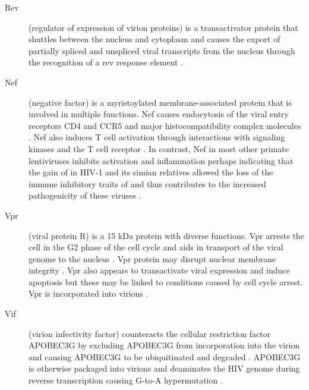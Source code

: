 \documentclass[../sherrill-Mix_thesis.tex]{subfiles}
\begin{document}
\begin{description}
		\item[Rev]
			(regulator of expression of virion proteins) is a transactivator protein that shuttles between the nucleus and cytoplasm \citep{Meyer1994} and causes the export of partially spliced and unspliced viral transcripts \citep{Sodroski1986,Feinberg1986,Knight1987,Malim1988,Gutman1988} from the nucleus through the recognition of a rev response element \citep{Malim1989,Malim1989a}.
		\item[Nef]
				(negative factor) is a myristoylated membrane-associated protein \citep{Yu1992} that is involved in multiple functions. Nef causes endocytosis of the viral entry receptors CD4 \citep{Garcia1991,Benson1993,Aiken1994,Lama1999,Ross1999} and CCR5 \citep{Michel2005} and major histocompatibility complex molecules \citep{Schwartz1996,Collins1998,Stumptner-Cuvelette2001,Blagoveshchenskaya2002}. Nef also induces T cell activation through interactions with signaling kinases and the T cell receptor \citep{Xu1999,Schrager1999,Wang2000,Simmons2001,Schrager2002}. In contrast, Nef in most other primate lentiviruses inhibits activation and inflammation \citep{Schindler2006} perhaps indicating that the gain of \vpu{} in HIV-1 and its simian relatives allowed the loss of the immune inhibitory traits of \nef{} and thus contributes to the increased pathogenicity of these viruses \citep{Kirchhoff2008,Kirchhoff2009}.
		\item[Vpr]
			(viral protein R) is a 15 kDa protein \citep{Wong-Staal1987,Cohen1990} with diverse functions. Vpr arrests the cell in the G2 phase of the cell cycle \citep{Jowett1995,Re1995,He1995,Rogel1995,Noronha2001} and aids in transport of the viral genome to the nucleus \citep{Heinzinger1994}. Vpr protein may disrupt nuclear membrane integrity \citep{Noronha2001}. Vpr also appears to transactivate viral expression \citep{Goh1998,Subbramanian1998} and induce apoptosis \citep{Stewart1997,Shostak1999} but these may be linked to conditions caused by cell cycle arrest.  Vpr is incorporated into virions \citep{Cohen1990a,Yuan1990}.
		\item[Vif]
			(virion infectivity factor) counteracts the cellular restriction factor APOBEC3G \citep{Sheehy2002} by excluding APOBEC3G from incorporation into the virion \citep{Mariani2003} and causing APOBEC3G to be ubiquitinated and degraded \citep{Sheehy2003,Marin2003,Yu2003}. APOBEC3G is otherwise packaged into virions \citep{Harris2003} and deaminates the HIV genome during reverse transcription causing G-to-A hypermutation \citep{Harris2003,Mangeat2003,Zhang2003,Lecossier2003}.

\end{description}
\end{document}
